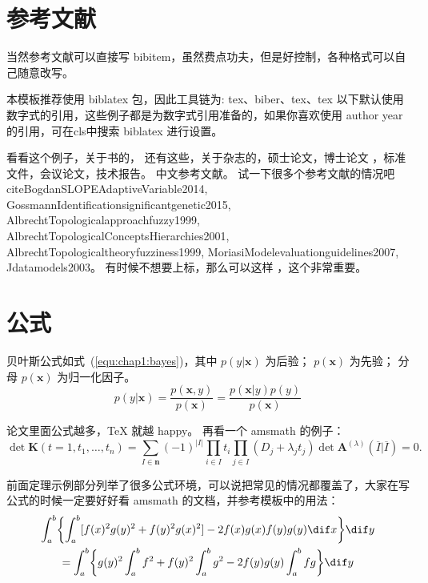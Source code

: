 \section{参考文献}
\label{sec:bib}
当然参考文献可以直接写 bibitem，虽然费点功夫，但是好控制，各种格式可以自己随意改写。

本模板推荐使用 biblatex 包，因此工具链为: tex、biber、tex、tex 以下默认使用数字式的引用，这些例子都是为数字式引用准备的，如果你喜欢使用 author year 的引用，可在cls中搜索 biblatex 进行设置。

看看这个例子，关于书的\cite{tex, companion,ColdSources}， 还有这些\cite{Krasnogor2004e, clzs, zjsw}，关于杂志的\cite{ELIDRISSI94, MELLINGER96, SHELL02}，硕士论文\cite{zhubajie, metamori2004}，博士论文 \cite{shaheshang, FistSystem01}，标准文件\cite{IEEE-1363}，会议论文\cite{DPMG,kocher99}，技术报告\cite{NPB2}。
中文参考文献\cite{cnarticle}。
试一下很多个参考文献的情况吧
cite{BogdanSLOPEAdaptiveVariable2014, GossmannIdentificationsignificantgenetic2015, AlbrechtTopologicalapproachfuzzy1999, AlbrechtTopologicalConceptsHierarchies2001, AlbrechtTopologicaltheoryfuzziness1999, MoriasiModelevaluationguidelines2007, Jdatamodels2003}。
有时候不想要上标，那么可以这样 \parencite{shaheshang}，这个非常重要。

\section{公式}
\label{sec:equation}
贝叶斯公式如式~(\ref{equ:chap1:bayes})，其中 $p(y|\mathbf{x})$ 为后验；
$p(\mathbf{x})$ 为先验；
分母 $p(\mathbf{x})$ 为归一化因子。
\begin{equation}
  \label{equ:chap1:bayes}
  p(y|\mathbf{x}) = \frac{p(\mathbf{x},y)}{p(\mathbf{x})}=
  \frac{p(\mathbf{x}|y)p(y)}{p(\mathbf{x})}
\end{equation}

论文里面公式越多，\TeX{} 就越 happy。
再看一个 \textsf{amsmath} 的例子：
\newcommand{\envert}[1]{\left\lvert#1\right\rvert}
\begin{equation}\label{detK2}
  \det\mathbf{K}(t=1,t_1,\dots,t_n)=\sum_{I\in\mathbf{n}}(-1)^{\envert{I}}
  \prod_{i\in I}t_i\prod_{j\in I}(D_j+\lambda_jt_j)\det\mathbf{A}
  ^{(\lambda)}(\overline{I}|\overline{I})=0.
\end{equation}

前面定理示例部分列举了很多公式环境，可以说把常见的情况都覆盖了，大家在写公式的时候一定要好好看 \textsf{amsmath} 的文档，并参考模板中的用法：
\begin{multline*}%
  \int_a^b\biggl\{\int_a^b[f(x)^2g(y)^2+f(y)^2g(x)^2]
  -2f(x)g(x)f(y)g(y)\dif x\biggr\}\dif y \\
  =\int_a^b\biggl\{g(y)^2\int_a^bf^2+f(y)^2
  \int_a^b g^2-2f(y)g(y)\int_a^b fg\biggr\}\dif y
\end{multline*}

